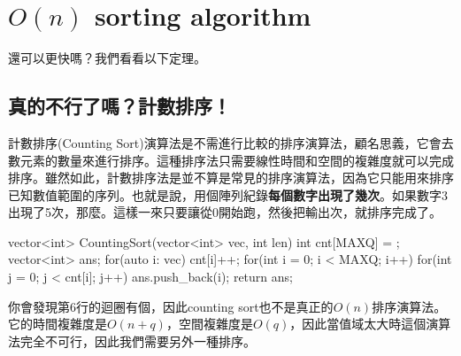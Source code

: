 \documentclass[main.tex]{subfiles}
\begin{document}
\section{$O(n)$ sorting algorithm}

還可以更快嗎？我們看看以下定理。


\subsection{真的不行了嗎？計數排序！}
計數排序(Counting Sort)演算法是不需進行比較的排序演算法，顧名思義，它會去數元素的數量來進行排序。這種排序法只需要線性時間和空間的複雜度就可以完成排序。雖然如此，計數排序法是並不算是常見的排序演算法，因為它只能用來排序已知數值範圍的序列。也就是說，用個陣列紀錄\textbf{每個數字出現了幾次}。如果數字3出現了5次，那麼。這樣一來只要讓從0開始跑，然後把輸出次，就排序完成了。
\begin{C++}
vector<int> CountingSort(vector<int> vec, int len){
    int cnt[MAXQ] = {};
    vector<int> ans;
    for(auto i: vec)
        cnt[i]++;
    for(int i = 0; i < MAXQ; i++)
        for(int j = 0; j < cnt[i]; j++)
            ans.push_back(i);
    return ans;
}
\end{C++}
你會發現第6行的迴圈有個，因此counting sort也不是真正的$O(n)$排序演算法。它的時間複雜度是$O(n+q)$，空間複雜度是$O(q)$，因此當值域太大時這個演算法完全不可行，因此我們需要另外一種排序。
\end{document}
